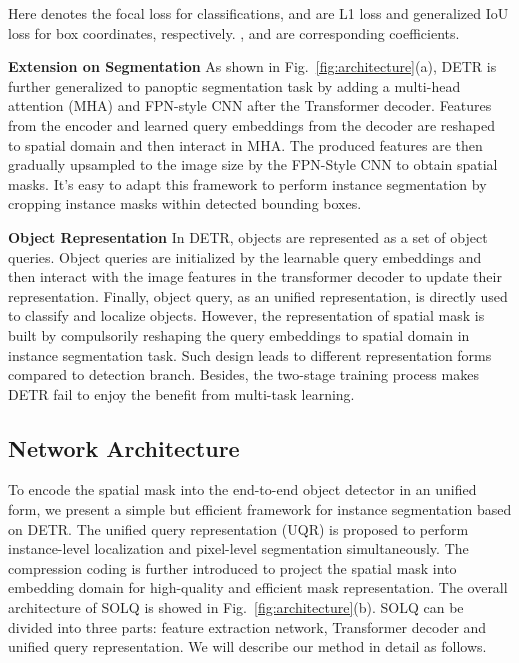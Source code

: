 \documentclass{article}
\begin{document}
Here  denotes the focal loss \cite{lin2017focalloss} for classifications,  and  are L1 loss and generalized IoU loss \cite{rezatofighi2019giou} for box coordinates, respectively. ,  and  are corresponding coefficients. 

\textbf{Extension on Segmentation}
As shown in Fig.~\ref{fig:architecture}(a), DETR is further generalized to panoptic segmentation task by adding a multi-head attention (MHA) and FPN-style CNN after the Transformer decoder. Features from the encoder and learned query embeddings from the decoder are reshaped to spatial domain and then interact in MHA. The produced features are then gradually upsampled to the image size by the FPN-Style CNN to obtain spatial masks. It's easy to adapt this framework to perform instance segmentation by cropping instance masks within detected bounding boxes. 

\textbf{Object Representation}
In DETR, objects are represented as a set of object queries. Object queries are initialized by the learnable query embeddings and then interact with the image features in the transformer decoder to update their representation. Finally, object query, as an unified representation, is directly used to classify and localize objects. However, the representation of spatial mask is built by compulsorily reshaping the query embeddings to spatial domain in instance segmentation task. Such design leads to different representation forms compared to detection branch. Besides, the two-stage training process makes DETR fail to enjoy the benefit from multi-task learning. 

\subsection{Network Architecture}
To encode the spatial mask into the end-to-end object detector in an unified form, we present a simple but efficient framework for instance segmentation based on DETR. The unified query representation (UQR) is proposed to perform instance-level localization and pixel-level segmentation simultaneously. The compression coding is further introduced to project the spatial mask into embedding domain for high-quality and efficient mask representation. 
The overall architecture of SOLQ is showed in Fig.~\ref{fig:architecture}(b). SOLQ can be divided into three parts: feature extraction network, Transformer decoder and unified query representation. We will describe our method in detail as follows.
\end{document}
